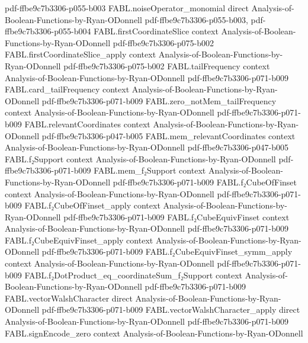 \begin{theorem}
  {pdf-ffbe9c7b3306-p055-b003}
\proofstep
  {FABL.noiseOperator_monomial}
  {direct}
  {Analysis-of-Boolean-Functions-by-Ryan-ODonnell}
  {pdf-ffbe9c7b3306-p055-b003,
    pdf-ffbe9c7b3306-p055-b004}
\proofstep
  {FABL.firstCoordinateSlice}
  {context}
  {Analysis-of-Boolean-Functions-by-Ryan-ODonnell}
  {pdf-ffbe9c7b3306-p075-b002}
\proofstep
  {FABL.firstCoordinateSlice_apply}
  {context}
  {Analysis-of-Boolean-Functions-by-Ryan-ODonnell}
  {pdf-ffbe9c7b3306-p075-b002}
\proofstep
  {FABL.tailFrequency}
  {context}
  {Analysis-of-Boolean-Functions-by-Ryan-ODonnell}
  {pdf-ffbe9c7b3306-p071-b009}
\proofstep
  {FABL.card_tailFrequency}
  {context}
  {Analysis-of-Boolean-Functions-by-Ryan-ODonnell}
  {pdf-ffbe9c7b3306-p071-b009}
\proofstep
  {FABL.zero_notMem_tailFrequency}
  {context}
  {Analysis-of-Boolean-Functions-by-Ryan-ODonnell}
  {pdf-ffbe9c7b3306-p071-b009}
\proofstep
  {FABL.relevantCoordinates}
  {context}
  {Analysis-of-Boolean-Functions-by-Ryan-ODonnell}
  {pdf-ffbe9c7b3306-p047-b005}
\proofstep
  {FABL.mem_relevantCoordinates}
  {context}
  {Analysis-of-Boolean-Functions-by-Ryan-ODonnell}
  {pdf-ffbe9c7b3306-p047-b005}
\proofstep
  {FABL.f₂Support}
  {context}
  {Analysis-of-Boolean-Functions-by-Ryan-ODonnell}
  {pdf-ffbe9c7b3306-p071-b009}
\proofstep
  {FABL.mem_f₂Support}
  {context}
  {Analysis-of-Boolean-Functions-by-Ryan-ODonnell}
  {pdf-ffbe9c7b3306-p071-b009}
\proofstep
  {FABL.f₂CubeOfFinset}
  {context}
  {Analysis-of-Boolean-Functions-by-Ryan-ODonnell}
  {pdf-ffbe9c7b3306-p071-b009}
\proofstep
  {FABL.f₂CubeOfFinset_apply}
  {context}
  {Analysis-of-Boolean-Functions-by-Ryan-ODonnell}
  {pdf-ffbe9c7b3306-p071-b009}
\proofstep
  {FABL.f₂CubeEquivFinset}
  {context}
  {Analysis-of-Boolean-Functions-by-Ryan-ODonnell}
  {pdf-ffbe9c7b3306-p071-b009}
\proofstep
  {FABL.f₂CubeEquivFinset_apply}
  {context}
  {Analysis-of-Boolean-Functions-by-Ryan-ODonnell}
  {pdf-ffbe9c7b3306-p071-b009}
\proofstep
  {FABL.f₂CubeEquivFinset_symm_apply}
  {context}
  {Analysis-of-Boolean-Functions-by-Ryan-ODonnell}
  {pdf-ffbe9c7b3306-p071-b009}
\proofstep
  {FABL.f₂DotProduct_eq_coordinateSum_f₂Support}
  {context}
  {Analysis-of-Boolean-Functions-by-Ryan-ODonnell}
  {pdf-ffbe9c7b3306-p071-b009}
\proofstep
  {FABL.vectorWalshCharacter}
  {direct}
  {Analysis-of-Boolean-Functions-by-Ryan-ODonnell}
  {pdf-ffbe9c7b3306-p071-b009}
\proofstep
  {FABL.vectorWalshCharacter_apply}
  {direct}
  {Analysis-of-Boolean-Functions-by-Ryan-ODonnell}
  {pdf-ffbe9c7b3306-p071-b009}
\proofstep
  {FABL.signEncode_zero}
  {context}
  {Analysis-of-Boolean-Functions-by-Ryan-ODonnell}

\end{theorem}
